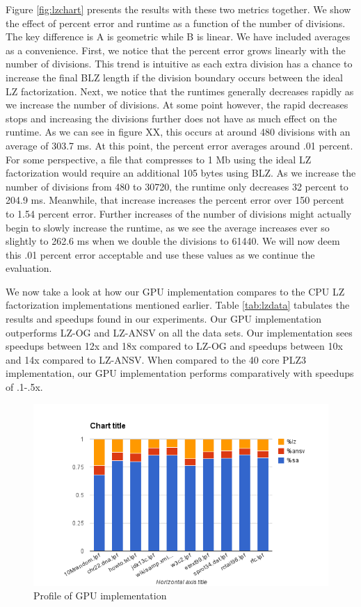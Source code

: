 Figure \ref{fig:lzchart} presents the results with these two metrics together.
We show the effect of percent error and runtime as a function of the number of divisions.
The key difference is A is geometric while B is linear.
We have included averages as a convenience.
First, we notice that the percent error grows linearly with the number of divisions.
This trend is intuitive as each extra division has a chance to increase the final BLZ length if the division boundary occurs between the ideal LZ factorization.
Next, we notice that the runtimes generally decreases rapidly as we increase the number of divisions.
At some point however, the rapid decreases stops and increasing the divisions further does not have as much effect on the runtime.
As we can see in figure XX, this occurs at around 480 divisions with an average of 303.7 ms.
At this point, the percent error averages around .01 percent.
For some perspective, a file that compresses to 1 Mb using the ideal LZ factorization would require an additional 105 bytes using BLZ.
As we increase the number of divisions from 480 to 30720, the runtime only decreases 32 percent to 204.9 ms.
Meanwhile, that increase increases the percent error over 150 percent to 1.54 percent error.
Further increases of the number of divisions might actually begin to slowly increase the runtime, as we see the average increases ever so slightly to 262.6 ms when we double the divisions to 61440.
We will now deem this .01 percent error acceptable and use these values as we continue the evaluation.

We now take a look at how our GPU implementation compares to the CPU LZ factorization implementations mentioned earlier.
Table \ref{tab:lzdata} tabulates the results and speedups found in our experiments.
Our GPU implementation outperforms LZ-OG and LZ-ANSV on all the data sets.
Our implementation sees speedups between 12x and 18x compared to LZ-OG and speedups between 10x and 14x compared to LZ-ANSV.
When compared to the 40 core PLZ3 implementation, our GPU implementation performs comparatively with speedups of .1-.5x.

\begin{figure}[ht!]
\centering
\includegraphics[width=1.0\textwidth]{images/allprof.png}
\caption{Profile of GPU implementation}
\label{fig:allprof}
\end{figure}

